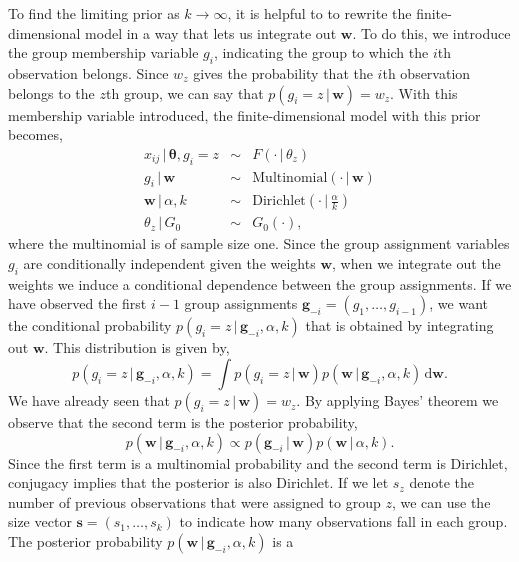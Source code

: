 \documentclass[authoryear]{elsarticle}
\newcommand{\condon}{\,|\,}
\newcommand{\vctr}[1]{\bm{#1}}
\begin{document}
To find the limiting prior as $k \rightarrow \infty$, it is helpful to to
rewrite the finite-dimensional model in a
way that lets us integrate out $\vctr{w}$. To do this, we introduce the group
membership variable $g_i$,  indicating the group to which the $i$th observation
belongs.  Since $w_z$ gives the probability that the $i$th observation belongs to the
$z$th group, we can say that $p(g_i=z \condon \vctr{w})=w_z$.  With this
membership variable introduced, the finite-dimensional model with this prior
becomes,
\begin{equation}
        \begin{array}{rcl}
        x_{ij} \condon \vctr{\theta}, g_i=z & \sim & F(\cdot \condon \theta_z) \\
        g_i \condon \vctr{w} & \sim & \mbox{Multinomial}(\cdot \condon\vctr{w}) \\
        \vctr{w} \condon \alpha, k & \sim & \mbox{Dirichlet}(\cdot \condon
        \frac{\alpha}{k}) \\
        \theta_z \condon G_0 & \sim & G_0(\cdot),
        \end{array}
        \label{finiteprior2}
\end{equation}
where the multinomial is of sample size one. Since the group assignment variables $g_i$ are
conditionally independent given the weights $\vctr{w}$, when we integrate out the
weights we induce a conditional dependence between the group assignments. If we have
observed the first $i-1$ group assignments $\vctr{g}_{-i} = (g_1, \ldots, g_{i-1})$, we want
the conditional probability $p(g_i=z \condon \vctr{g}_{-i}, \alpha, k)$ that is obtained by
integrating out $\vctr{w}$. This distribution is given by,
\[
        p(g_i=z \condon \vctr{g}_{-i}, \alpha, k) = \int p(g_i=z \condon \vctr{w})
        p(\vctr{w} \condon \vctr{g}_{-i}, \alpha, k) \, \mathrm{d}\vctr{w}.
\]
We have already seen that  $p(g_i=z \condon \vctr{w})=w_z$. By applying Bayes'
theorem we observe that the second term is the posterior probability,
\[
        p(\vctr{w} \condon \vctr{g}_{-i}, \alpha, k) \propto p(\vctr{g}_{-i } \condon \vctr{w})
        p(\vctr{w} \condon \alpha, k).
\]
Since the first term is a multinomial probability and the second term is Dirichlet,
conjugacy implies that the posterior is also Dirichlet. If we let $s_z$ denote the number of
previous observations that were assigned to group $z$, we can use the size vector
$\vctr{s}=(s_1, \ldots, s_k)$ to indicate how many observations fall in each group.
The posterior probability $p(\vctr{w} \condon \vctr{g}_{-i}, \alpha, k)$ is a
\end{document}
